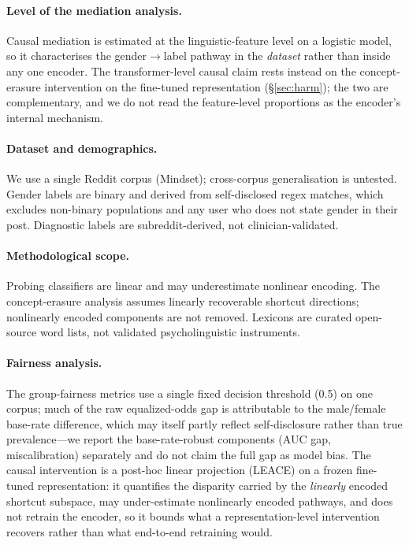 \documentclass[11pt]{article}
\begin{document}
\paragraph{Level of the mediation analysis.} Causal mediation is estimated at the linguistic-feature level on a logistic model, so it characterises the gender$\to$label pathway in the \emph{dataset} rather than inside any one encoder. The transformer-level causal claim rests instead on the concept-erasure intervention on the fine-tuned representation (\S\ref{sec:harm}); the two are complementary, and we do not read the feature-level proportions as the encoder's internal mechanism.

\paragraph{Dataset and demographics.} We use a single Reddit corpus (Mindset); cross-corpus generalisation is untested. Gender labels are binary and derived from self-disclosed regex matches, which excludes non-binary populations and any user who does not state gender in their post. Diagnostic labels are subreddit-derived, not clinician-validated.

\paragraph{Methodological scope.} Probing classifiers are linear and may underestimate nonlinear encoding. The concept-erasure analysis assumes linearly recoverable shortcut directions; nonlinearly encoded components are not removed. Lexicons are curated open-source word lists, not validated psycholinguistic instruments.

\paragraph{Fairness analysis.} The group-fairness metrics use a single fixed decision threshold (0.5) on one corpus; much of the raw equalized-odds gap is attributable to the male/female base-rate difference, which may itself partly reflect self-disclosure rather than true prevalence---we report the base-rate-robust components (AUC gap, miscalibration) separately and do not claim the full gap as model bias. The causal intervention is a post-hoc linear projection (LEACE) on a frozen fine-tuned representation: it quantifies the disparity carried by the \emph{linearly} encoded shortcut subspace, may under-estimate nonlinearly encoded pathways, and does not retrain the encoder, so it bounds what a representation-level intervention recovers rather than what end-to-end retraining would.
\end{document}
